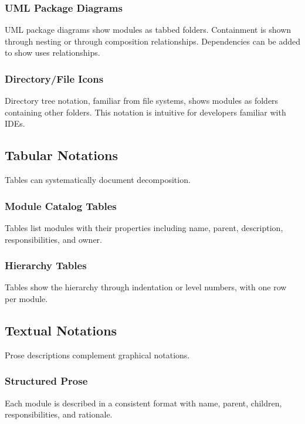 \documentclass[11pt]{article}
\begin{document}
\subsubsection{UML Package Diagrams}

UML package diagrams show modules as tabbed folders. Containment is shown through nesting or through composition relationships. Dependencies can be added to show uses relationships.

\subsubsection{Directory/File Icons}

Directory tree notation, familiar from file systems, shows modules as folders containing other folders. This notation is intuitive for developers familiar with IDEs.

\subsection{Tabular Notations}

Tables can systematically document decomposition.

\subsubsection{Module Catalog Tables}

Tables list modules with their properties including name, parent, description, responsibilities, and owner.

\subsubsection{Hierarchy Tables}

Tables show the hierarchy through indentation or level numbers, with one row per module.

\subsection{Textual Notations}

Prose descriptions complement graphical notations.

\subsubsection{Structured Prose}

Each module is described in a consistent format with name, parent, children, responsibilities, and rationale.
\end{document}
